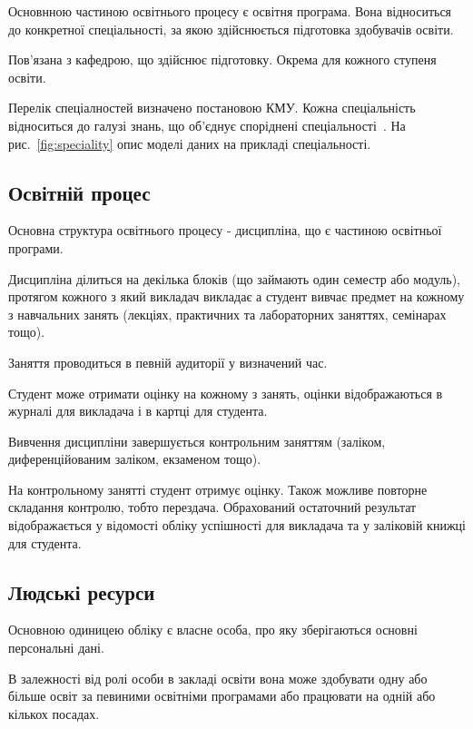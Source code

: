 Основнною частиною освітнього процесу є освітня програма. Вона відноситься до конкретної спеціальності, за якою здійснюється підготовка здобувачів освіти.

Пов'язана з кафедрою, що здійснює підготовку. Окрема для кожного ступеня освіти.

Перелік спеціалностей визначено постановою КМУ. Кожна спеціальність відноситься до галузі знань, що об'єднує споріднені спеціальності~\cite{постанова2017затвердження}. На рис.~\ref{fig:speciality} опис моделі даних на прикладі спеціальності.



\subsection{Освітній процес}

Основна структура освітнього процесу - дисципліна, що є частиною освітньої програми.

Дисципліна ділиться на декілька блоків (що займають один семестр або модуль), протягом кожного з який викладач викладає а студент вивчає предмет на кожному з навчальних занять (лекціях, практичних та лабораторних заняттях, семінарах тощо).

Заняття проводиться в певній аудиторії у визначений час.

Студент може отримати оцінку на кожному з занять, оцінки відображаються в журналі для викладача і в картці для студента.

Вивчення дисципліни завершується контрольним заняттям (заліком, диференційованим заліком, екзаменом тощо).

На контрольному занятті студент отримує оцінку. Також можливе повторне складання контролю, тобто перездача. Обрахований остаточний результат відображається у відомості обліку успішності для викладача та у заліковій книжці для студента.

\subsection{Людські ресурси}

Основною одиницею обліку є власне особа, про яку зберігаються основні персональні дані.

В залежності від ролі особи в закладі освіти вона може здобувати одну або більше освіт за певиними освітніми програмами або працювати на одній або кількох посадах.

